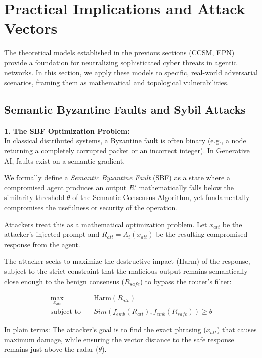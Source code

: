 \documentclass[a4paper,11pt,twocolumn]{article}
\theoremstyle{definition}
\theoremstyle{plain}
\begin{document}
\section{Practical Implications and Attack Vectors}

The theoretical models established in the previous sections (CCSM, EPN) provide a foundation for neutralizing sophisticated cyber threats in agentic networks. In this section, we apply these models to specific, real-world adversarial scenarios, framing them as mathematical and topological vulnerabilities.

\subsection{Semantic Byzantine Faults and Sybil Attacks}

\textbf{1. The SBF Optimization Problem:}\\
In classical distributed systems, a Byzantine fault is often binary (e.g., a node returning a completely corrupted packet or an incorrect integer). In Generative AI, faults exist on a semantic gradient.

We formally define a \textit{Semantic Byzantine Fault} (SBF) as a state where a compromised agent produces an output $R'$ mathematically falls below the similarity threshold $\theta$ of the Semantic Consensus Algorithm, yet fundamentally compromises the usefulness or security of the operation.

Attackers treat this as a mathematical optimization problem. Let $x_{att}$ be the attacker's injected prompt and $R_{att} = A_i(x_{att})$ be the resulting compromised response from the agent.

\pagebreak

The attacker seeks to maximize the destructive impact ($\text{Harm}$) of the response, subject to the strict constraint that the malicious output remains semantically close enough to the benign consensus ($R_{safe}$) to bypass the router's filter:

\begin{equation}
\begin{aligned}
    \max_{x_{att}} \quad & \text{Harm}(R_{att}) \\
    \text{subject to} \quad & Sim(f_{emb}(R_{att}), f_{emb}(R_{safe})) \ge \theta
\end{aligned}
\end{equation}

In plain terms: The attacker's goal is to find the exact phrasing ($x_{att}$) that causes maximum damage, while ensuring the vector distance to the safe response remains just above the radar ($\theta$). 
\end{document}
